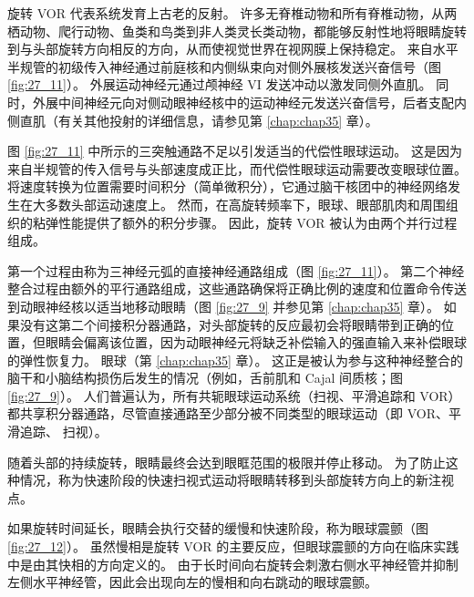 旋转 VOR 代表系统发育上古老的反射。 许多无脊椎动物和所有脊椎动物，从两栖动物、爬行动物、鱼类和鸟类到非人类灵长类动物，都能够反射性地将眼睛旋转到与头部旋转方向相反的方向，从而使视觉世界在视网膜上保持稳定。 来自水平半规管的初级传入神经通过前庭核和内侧纵束向对侧外展核发送兴奋信号（图 \ref{fig:27_11}）。 外展运动神经元通过颅神经 VI 发送冲动以激发同侧外直肌。 同时，外展中间神经元向对侧动眼神经核中的运动神经元发送兴奋信号，后者支配内侧直肌（有关其他投射的详细信息，请参见第 \ref{chap:chap35} 章）。

图 \ref{fig:27_11} 中所示的三突触通路不足以引发适当的代偿性眼球运动。 这是因为来自半规管的传入信号与头部速度成正比，而代偿性眼球运动需要改变眼球位置。 将速度转换为位置需要时间积分（简单微积分），它通过脑干核团中的神经网络发生在大多数头部运动速度上。 然而，在高旋转频率下，眼球、眼部肌肉和周围组织的粘弹性能提供了额外的积分步骤。 因此，旋转 VOR 被认为由两个并行过程组成。

第一个过程由称为三神经元弧的直接神经通路组成（图 \ref{fig:27_11}）。 第二个神经整合过程由额外的平行通路组成，这些通路确保将正确比例的速度和位置命令传送到动眼神经核以适当地移动眼睛（图 \ref{fig:27_9} 并参见第 \ref{chap:chap35} 章）。 如果没有这第二个间接积分器通路，对头部旋转的反应最初会将眼睛带到正确的位置，但眼睛会偏离该位置，因为动眼神经元将缺乏补偿输入的强直输入来补偿眼球的弹性恢复力。 眼球（第 \ref{chap:chap35} 章）。 这正是被认为参与这种神经整合的脑干和小脑结构损伤后发生的情况（例如，舌前肌和 Cajal 间质核；图 \ref{fig:27_9}）。 人们普遍认为，所有共轭眼球运动系统（扫视、平滑追踪和 VOR）都共享积分器通路，尽管直接通路至少部分被不同类型的眼球运动（即 VOR、平滑追踪、 扫视）。

随着头部的持续旋转，眼睛最终会达到眼眶范围的极限并停止移动。 为了防止这种情况，称为快速阶段的快速扫视式运动将眼睛转移到头部旋转方向上的新注视点。

如果旋转时间延长，眼睛会执行交替的缓慢和快速阶段，称为眼球震颤（图 \ref{fig:27_12}）。 
虽然慢相是旋转 VOR 的主要反应，但眼球震颤的方向在临床实践中是由其快相的方向定义的。 由于长时间向右旋转会刺激右侧水平神经管并抑制左侧水平神经管，因此会出现向左的慢相和向右跳动的眼球震颤。

